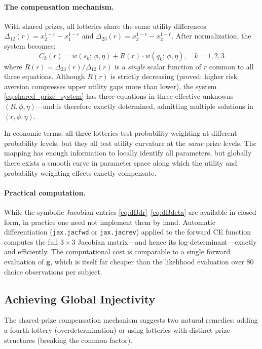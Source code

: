 \documentclass[11pt,a4paper]{article}
\theoremstyle{definition}
\begin{document}
\paragraph{The compensation mechanism.} With shared prizes, all lotteries
share the same utility differences $\Delta_{12}(r) = x_2^{1-r} - x_1^{1-r}$
and $\Delta_{23}(r) = x_3^{1-r} - x_2^{1-r}$. After normalization, the system
becomes:
\begin{equation}
    \label{eq:shared_prize_system}
    C_k(r) = w(s_k;\, \phi, \eta) + R(r) \cdot w(q_k;\, \phi, \eta),
    \quad k = 1, 2, 3
\end{equation}
where $R(r) = \Delta_{23}(r)/\Delta_{12}(r)$ is a \emph{single} scalar
function of $r$ common to all three equations. Although $R(r)$ is strictly
decreasing (proved: higher risk aversion compresses upper utility gaps more
than lower), the system \eqref{eq:shared_prize_system} has three equations in
three effective unknowns---$(R, \phi, \eta)$---and is therefore exactly
determined, admitting multiple solutions in $(r, \phi, \eta)$.

In economic terms: all three lotteries test probability weighting at different
probability levels, but they all test utility curvature at the \emph{same}
prize levels. The mapping has enough information to locally identify all
parameters, but globally there exists a smooth curve in parameter space along
which the utility and probability weighting effects exactly compensate.

\paragraph{Practical computation.} While the symbolic Jacobian entries
\eqref{eq:dBdr}--\eqref{eq:dBdeta} are available in closed form, in practice
one need not implement them by hand. Automatic differentiation
(\texttt{jax.jacfwd} or \texttt{jax.jacrev}) applied to the forward CE
function computes the full $3 \times 3$ Jacobian matrix---and hence its
log-determinant---exactly and efficiently. The computational cost is comparable
to a single forward evaluation of $\mathbf{g}$, which is itself far cheaper
than the likelihood evaluation over 80 choice observations per subject.

\subsection{Achieving Global Injectivity}
\label{sec:global_injectivity}

The shared-prize compensation mechanism suggests two natural remedies: adding
a fourth lottery (overdetermination) or using lotteries with distinct prize
structures (breaking the common factor).
\end{document}
